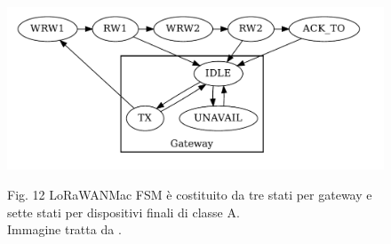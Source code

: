 \documentclass[a4paper]{report} %
\begin{document}
\begin{figure}
\centering
\includegraphics[scale=.3]{Immagini/MSFLoRaMAC.png}

Fig. 12 LoRaWANMac FSM è costituito da tre stati per gateway e sette stati per dispositivi finali di classe A.\\
Immagine tratta da \cite{art:rif.49}. \\
\end{figure}
\end{document}
